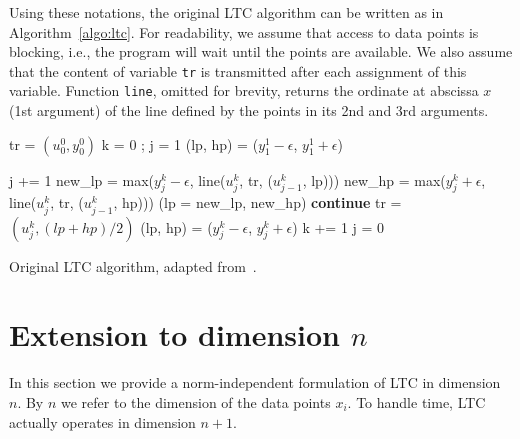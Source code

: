 \documentclass[10pt, conference, compsocconf]{IEEEtran}
\newcommand{\todo}[1]{\marginpar{\parbox{18mm}{\flushleft\tiny\color{red}\textbf{TODO}:
      #1}}}
\begin{document}
Using these notations, the original LTC algorithm can
be written as in Algorithm~\ref{algo:ltc}. For readability, we assume
that access to data points is blocking, i.e., the program will wait
until the points are available. We also assume that the content of
variable \texttt{tr} is transmitted after each assignment of this
variable. Function \texttt{line}, omitted for brevity, returns the
ordinate at abscissa $x$ (1st argument) of the line defined by the points
in its 2nd and 3rd arguments.

\begin{algorithm}
\begin{algorithmic}[1]
\State tr = $(u^0_0, y^0_0)$ 
\State k = 0 ; j = 1
\State (lp, hp) = ($y^1_1 - \epsilon$, $y^1_1 + \epsilon$) 

 
    \State j += 1
    \State new\_lp = max($y^k_j-\epsilon$, line($u^k_j$, tr, ($u^k_{j-1}$, lp)))
    \State new\_hp = max($y^k_j+\epsilon$, line($u^k_j$, tr, ($u^k_{j-1}$, hp)))
     
        \State (lp = new\_lp, new\_hp)
        \State \textbf{continue}
    \EndIf
    \State tr = $(u^k_j, (lp+hp)/2)$
    \State (lp, hp) = ($y^k_j-\epsilon$, $y^k_j+\epsilon$)
    \State k += 1
    \State j = 0
\EndWhile
\end{algorithmic}
\caption{Original LTC algorithm, adapted from~\cite{schoellhammer2004lightweight}.}
\label{algo:ltc}
\end{algorithm}




\section{Extension to dimension $n$}
\label{sec:extension}
In this section we provide a norm-independent formulation of LTC in
dimension $n$. By $n$ we refer to the dimension of the data points
$x_i$. To handle time, LTC actually operates in dimension
$n+1$.
\end{document}
